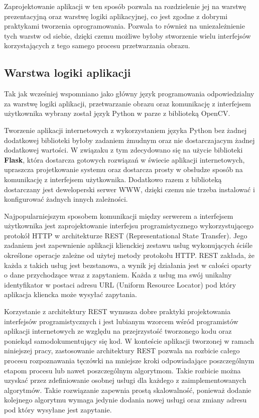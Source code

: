 Zaprojektowanie aplikacji w ten sposób pozwala na rozdzielenie jej na warstwę prezentacyjną
oraz warstwę logiki aplikacyjnej, co jest zgodne z dobrymi praktykami tworzenia oprogramowania.
Pozwala to również na uniezależnienie tych warstw od siebie, dzięki czemu możliwe
byłoby stworzenie wielu interfejsów korzystających z tego samego procesu przetwarzania obrazu.

\subsection{Warstwa logiki aplikacji}

Tak jak wcześniej wspomniano jako główny język programowania odpowiedzialny za warstwę logiki
aplikacji, przetwarzanie obrazu oraz komunikację z interfejsem użytkownika wybrany został język
Python w parze z biblioteką OpenCV.

Tworzenie aplikacji internetowych z wykorzystaniem języka Python bez żadnej dodatkowej
biblioteki byłoby zadaniem żmudnym oraz nie dostarczajacym żadnej dodatkowej wartości. W związaku
z tym zdecydowano się na użycie biblioteki \textbf{Flask}, która dostarcza gotowych rozwiązań
w świecie aplikacji internetowych, upraszcza projetkowanie systemu oraz dostarcza prosty w obsłudze
sposób na komunikację z interfejsem użytkownika. Dodatkowo razem z biblioteką dostarczany jest
deweloperski serwer WWW, dzięki czemu nie trzeba instalowa\'c i konfigurowa\'c żadnych innych zależności.
\newline

Najpopularniejszym sposobem komunikacji między serwerem a interfejsem użytkownika jest zaprojektowanie
interfejsu programistycznego wykorzystującego protokół HTTP w architekturze REST (Representational State Transfer).
Jego zadaniem jest zapewnienie aplikacji klienckiej zestawu usług wykonujących ściśle określone
operacje zależne od użytej metody protokołu HTTP. REST zakłada, że każda z takich usług jest bezstanowa, a wynik jej działania jest w całości
oparty o dane przychodzące wraz z zapytaniem. Każda z usług ma swój unikalny identyfikator w postaci
adresu URL (Uniform Resource Locator) pod który aplikacja kliencka może wysyła\'c zapytania.

Korzystanie z architektury REST wymusza dobre praktyki projektowania interfejsów programistycznych
i jest lubianym wzorcem wśród programistów aplikacji internetowych ze względu na przejrzystoś\'c
tworzonego kodu oraz poniekąd samodokumentujący się kod.
W konteście aplikacji tworzonej w ramach niniejszej pracy, zastosowanie architektury REST pozwala
na rozbicie całego procesu rozpoznawania tęczówki na mniejsze kroki odpowiadające poszczególnym
etapom procesu lub nawet poszczególnym algorytmom. Takie rozbicie można uzyska\'c przez zdefiniowanie
osobnej usługi dla każdego z zaimplementowanych algorytmów. Takie rozwiązanie zapewnia prostą skalowalnoś\'c,
ponieważ dodanie kolejnego algorytmu wymaga jedynie dodania nowej usługi oraz zmiany adresu pod który
wysyłane jest zapytanie.


